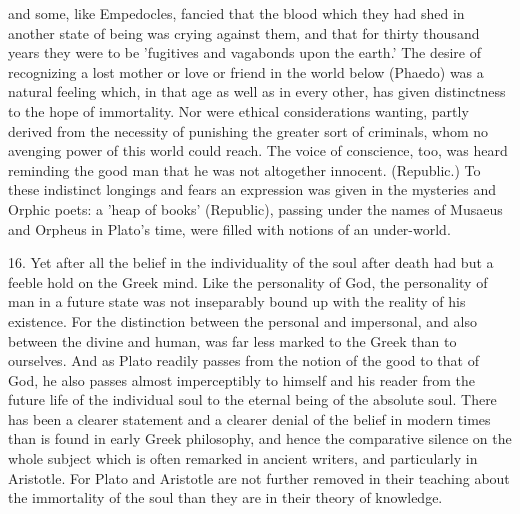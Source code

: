 and some, like Empedocles, fancied that the blood which they had shed
in another state of being was crying against them, and that for thirty
thousand years they were to be 'fugitives and vagabonds upon the earth.'
The desire of recognizing a lost mother or love or friend in the world
below (Phaedo) was a natural feeling which, in that age as well as in
every other, has given distinctness to the hope of immortality. Nor were
ethical considerations wanting, partly derived from the necessity of
punishing the greater sort of criminals, whom no avenging power of this
world could reach. The voice of conscience, too, was heard reminding
the good man that he was not altogether innocent. (Republic.) To these
indistinct longings and fears an expression was given in the mysteries
and Orphic poets: a 'heap of books' (Republic), passing under the names
of Musaeus and Orpheus in Plato's time, were filled with notions of an
under-world.

16. Yet after all the belief in the individuality of the soul after
death had but a feeble hold on the Greek mind. Like the personality of
God, the personality of man in a future state was not inseparably bound
up with the reality of his existence. For the distinction between the
personal and impersonal, and also between the divine and human, was far
less marked to the Greek than to ourselves. And as Plato readily passes
from the notion of the good to that of God, he also passes almost
imperceptibly to himself and his reader from the future life of the
individual soul to the eternal being of the absolute soul. There has
been a clearer statement and a clearer denial of the belief in modern
times than is found in early Greek philosophy, and hence the comparative
silence on the whole subject which is often remarked in ancient writers,
and particularly in Aristotle. For Plato and Aristotle are not further
removed in their teaching about the immortality of the soul than they
are in their theory of knowledge.

